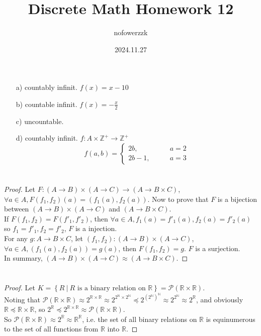 \documentclass{article}
\title{Discrete Math Homework 12}
\author{nofowerzzk}
\date{2024.11.27}
\newcommand{\RR}{\mathbb{R}}
\newcommand{\NN}{\mathbb{N}}
\begin{document}
\maketitle

\section{}

\begin{itemize}
    \item [a)] countably infinit. $f(x) = x - 10$
    \item [b)] countable infinit. $f(x) = -\frac{x}{2}$
    \item [c)] uncountable.
    \item [d)] countably infinit. $f: A \times \mathbb{Z}^+ \to \mathbb{Z}^+$
    \[
        f(a, b) = \left\{\begin{matrix}
            2b, &\qquad a = 2 \\
            2b - 1, &\qquad a = 3
        \end{matrix}\right.
    \]
\end{itemize}

\section{}

\begin{proof}
    Let $F: (A \to B) \times (A \to C) \to (A \to B \times C)$, $\forall a \in A, F(f_1, f_2)(a) = (f_1(a), f_2(a))$. Now to prove that $F$ is a bijection between $(A \to B) \times (A \to C)$ and $(A \to B \times C)$. \\
    If $F(f_1, f_2) = F(f'_1, f'_2)$, then $\forall a \in A, f_1(a) = f'_1(a), f_2(a) = f'_2(a)$ so $f_1 = f'_1, f_2 = f'_2$, $F$ is a injection. \\
    For any $g: A \to B \times C$, let $(f_1, f_2): (A \to B) \times (A \to C)$, $\forall a \in A, (f_1(a), f_2(a)) = g(a)$, then $F(f_1, f_2) = g$. $F$ is a surjection. \\
    In summary, $(A \to B) \times (A \to C) \approx (A \to B \times C)$.
\end{proof}

\section{}

\begin{proof}
    Let $K = \left\{R\ |\ R \text{ is a binary relation on } \mathbb{R}\right\} = \mathcal{P}(\mathbb{R} \times \mathbb{R})$. \\
    Noting that $\mathcal{P}(\mathbb{R} \times \mathbb{R}) \approx 2^{\RR \times \RR} \approx 2^{2^\NN \times 2^\NN} \preceq 2^{\left(2^\NN\right)^\NN} \approx 2^{2^\NN} \approx 2^\RR$, and obviously $\RR \preceq \RR \times \RR$, so $2^\RR \preceq 2^{\RR \times \RR} \approx \mathcal{P}(\RR \times \RR) $. \\
    So $\mathcal{P}(\RR \times \RR) \approx 2^\RR \approx \RR^\RR$, i.e. the set of all binary relations on $\RR$ is equinumerous to the set of all functions from $\RR$ into $\RR$.
\end{proof}
\end{document}
